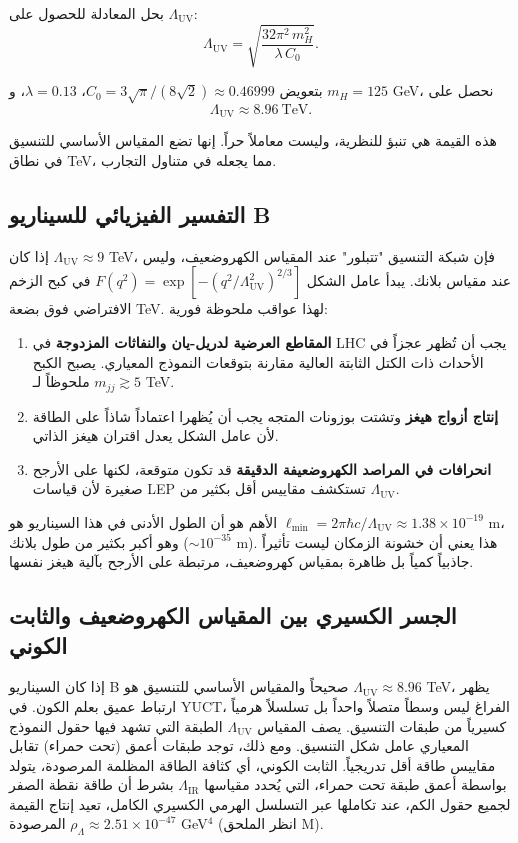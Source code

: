 \documentclass[11pt,a4paper]{article}
\newcommand{\Lmin}{\ell_{\min}}
\newcommand{\LUV}{\Lambda_{\mathrm{UV}}}
\theoremstyle{remark}
\begin{document}
\begin{otherlanguage}{arabic}
		بحل المعادلة للحصول على \(\LUV\):
		\begin{equation}
			\LUV = \sqrt{\frac{32\pi^2\, m_H^2}{\lambda\, C_0}}.
			\label{eq:LUV_solve}
		\end{equation}
		
		بتعويض \(C_0 = 3\sqrt{\pi}/(8\sqrt{2}) \approx 0.46999\)، \(\lambda = 0.13\)، و \(m_H = 125\) GeV، نحصل على
		\begin{equation}
			\boxed{\LUV \approx 8.96\ \mathrm{TeV}}.
			\label{eq:LUV_TeV}
		\end{equation}
		
		هذه القيمة هي تنبؤ للنظرية، وليست معاملاً حراً. إنها تضع المقياس الأساسي للتنسيق في نطاق TeV، مما يجعله في متناول التجارب.
		
		\subsection{التفسير الفيزيائي للسيناريو B}
		إذا كان \(\LUV \approx 9\) TeV، فإن شبكة التنسيق "تتبلور" عند المقياس الكهروضعيف، وليس عند مقياس بلانك. يبدأ عامل الشكل \(F(q^2) = \exp[-(q^2/\LUV^2)^{2/3}]\) في كبح الزخم الافتراضي فوق بضعة TeV. لهذا عواقب ملحوظة فورية:
		
		\begin{enumerate}[label=(\arabic*)]
			\item \textbf{المقاطع العرضية لدريل-يان والنفاثات المزدوجة} في LHC يجب أن تُظهر عجزاً في الأحداث ذات الكتل الثابتة العالية مقارنة بتوقعات النموذج المعياري. يصبح الكبح ملحوظاً لـ \(m_{jj} \gtrsim 5\) TeV.
			\item \textbf{إنتاج أزواج هيغز} وتشتت بوزونات المتجه يجب أن يُظهرا اعتماداً شاذاً على الطاقة لأن عامل الشكل يعدل اقتران هيغز الذاتي.
			\item \textbf{انحرافات في المراصد الكهروضعيفة الدقيقة} قد تكون متوقعة، لكنها على الأرجح صغيرة لأن قياسات LEP تستكشف مقاييس أقل بكثير من \(\LUV\).
		\end{enumerate}
		
		الأهم هو أن الطول الأدنى في هذا السيناريو هو \(\Lmin = 2\pi\hbar c/\LUV \approx 1.38\times 10^{-19}\) m، وهو أكبر بكثير من طول بلانك (\(\sim 10^{-35}\) m). هذا يعني أن خشونة الزمكان ليست تأثيراً جاذبياً كمياً بل ظاهرة بمقياس كهروضعيف، مرتبطة على الأرجح بآلية هيغز نفسها.
		
		\subsection{الجسر الكسيري بين المقياس الكهروضعيف والثابت الكوني}
		\label{subsec:bridge}
		إذا كان السيناريو B صحيحاً والمقياس الأساسي للتنسيق هو \(\LUV \approx 8.96\) TeV، يظهر ارتباط عميق بعلم الكون. في YUCT، الفراغ ليس وسطاً متصلاً واحداً بل تسلسلاً هرمياً كسيرياً من طبقات التنسيق. يصف المقياس \(\LUV\) الطبقة التي تشهد فيها حقول النموذج المعياري عامل شكل التنسيق. ومع ذلك، توجد طبقات أعمق (تحت حمراء) تقابل مقاييس طاقة أقل تدريجياً. الثابت الكوني، أي كثافة الطاقة المظلمة المرصودة، يتولد بواسطة أعمق طبقة تحت حمراء، التي يُحدد مقياسها \(\Lambda_{\mathrm{IR}}\) بشرط أن طاقة نقطة الصفر لجميع حقول الكم، عند تكاملها عبر التسلسل الهرمي الكسيري الكامل، تعيد إنتاج القيمة المرصودة \(\rho_{\Lambda} \approx 2.51 \times 10^{-47}\) GeV\(^4\) (انظر الملحق M).
		

\end{otherlanguage}
\end{document}
